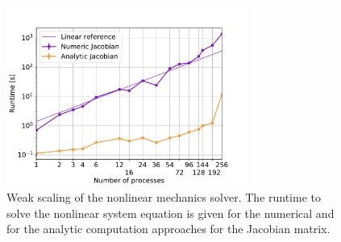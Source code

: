 \begin{figure}
  \centering%
  \includegraphics[width=0.7\textwidth]{images/results/studies/numeric_analytic.pdf}%
  \caption{Weak scaling of the nonlinear mechanics solver. The runtime to solve the nonlinear system equation is given for the numerical and for the analytic computation approaches for the Jacobian matrix.}%
  \label{fig:numeric_analytic}%
\end{figure}
